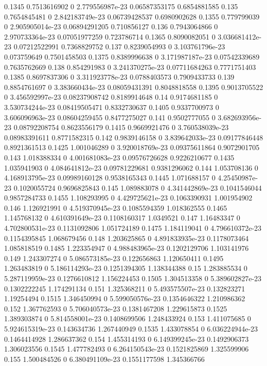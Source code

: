 {0.1345 0.7513616902 0 2.779556987e-23 0.06587353175 0.6854881585
0.135 0.7654845481 0 2.842183749e-23 0.06739428537 0.6980902628
0.1355 0.779799039 0 2.905905014e-23 0.06894291205 0.710856127
0.136 0.7943064866 0 2.970733364e-23 0.07051977259 0.723786714
0.1365 0.8090082051 0 3.036681412e-23 0.07212522991 0.7368829752
0.137 0.8239054993 0 3.103761796e-23 0.073759649 0.7501458503
0.1375 0.8389996638 0 3.171987187e-23 0.07542339689 0.7635762669
0.138 0.854291983 0 3.241370275e-23 0.07711684263 0.7771751403
0.1385 0.8697837306 0 3.311923778e-23 0.0788403573 0.7909433733
0.139 0.8854761697 0 3.383660434e-23 0.08059431391 0.8048818558
0.1395 0.9013705522 0 3.456592997e-23 0.08237908742 0.8189914648
0.14 0.9174681185 0 3.530734244e-23 0.08419505471 0.8332730637
0.1405 0.9337700973 0 3.606096963e-23 0.08604259455 0.8477275027
0.141 0.9502777055 0 3.682693956e-23 0.08792208754 0.8623556179
0.1415 0.9669921476 0 3.760538039e-23 0.08983391611 0.8771582315
0.142 0.9839146158 0 3.839642033e-23 0.09177846448 0.8921361513
0.1425 1.001046289 0 3.920018769e-23 0.09375611864 0.9072901705
0.143 1.018388334 0 4.001681083e-23 0.09576726628 0.9226210677
0.1435 1.035941903 0 4.084641812e-23 0.09781229681 0.9381296062
0.144 1.053708136 0 4.168913795e-23 0.09989160128 0.9538165343
0.1445 1.071688157 0 4.25450987e-23 0.1020055724 0.9696825843
0.145 1.089883078 0 4.341442869e-23 0.1041546044 0.9857284733
0.1455 1.108293995 0 4.429725621e-23 0.1063390931 1.001954902
0.146 1.126921991 0 4.519370945e-23 0.1085594359 1.018362555
0.1465 1.145768132 0 4.610391649e-23 0.1108160317 1.0349521
0.147 1.16483347 0 4.702800531e-23 0.1131092806 1.051724189
0.1475 1.184119041 0 4.796610372e-23 0.1154395845 1.068679456
0.148 1.203625865 0 4.891833935e-23 0.1178073464 1.085818519
0.1485 1.223354947 0 4.988483965e-23 0.1202129706 1.103141976
0.149 1.243307274 0 5.086573185e-23 0.122656863 1.120650411
0.1495 1.263483819 0 5.186114293e-23 0.1251394305 1.138344388
0.15 1.283885534 0 5.287119959e-23 0.1276610812 1.156224453
0.1505 1.304513358 0 5.389602827e-23 0.1302222245 1.174291134
0.151 1.325368211 0 5.493575507e-23 0.132823271 1.19254494
0.1515 1.346450994 0 5.599050576e-23 0.1354646322 1.210986362
0.152 1.367762593 0 5.706040573e-23 0.1381467208 1.229615873
0.1525 1.389303874 0 5.814558001e-23 0.1408699506 1.248433924
0.153 1.411075685 0 5.924615319e-23 0.143634736 1.267440949
0.1535 1.433078854 0 6.036224944e-23 0.1464414928 1.286637362
0.154 1.455314193 0 6.149399245e-23 0.1492906373 1.306023556
0.1545 1.477782493 0 6.264150543e-23 0.1521825869 1.325599906
0.155 1.500484526 0 6.380491109e-23 0.1551177598 1.345366766
}
